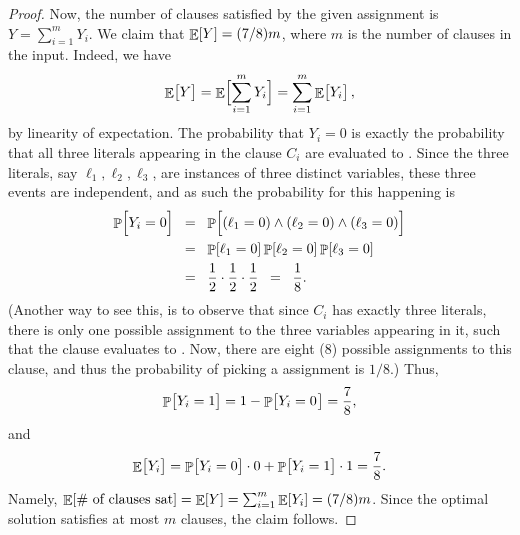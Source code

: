 \begin{proof}
    Now, the number of clauses satisfied by the given assignment is
    $Y=\sum_{i=1}^{m}Y_{i}$.  We claim that $\mathop{\mathbb{E}}\!\left[ {Y} \right] = (7/8)m$, where
    $m$ is the number of clauses in the input. Indeed, we have
    \begin{equation*}
        \Ex{Y\bigl.}%
        =%
        \Ex{\Bigl. \smash{\sum_{i=1}^{m}Y_{i}}}%
        =%
        \sum_{i=1}^{m}\Ex{Y_{i} \bigl.},
    \end{equation*}
    by linearity of expectation. The probability that $Y_{i} = 0$ is
    exactly the probability that all three literals appearing in the
    clause $C_i$ are evaluated to \FALSE. Since the three literals, say
    $\ell_1, \ell_2, \ell_3$, are instances of three distinct variables, these
    three events are independent, and as such the probability for this
    happening is
    \begin{align*}
        \Prob{\Bigl.Y_{i}
           =
           0 \bigl.}%
        &\EQ%
        \Prob{\Bigl. (\ell_1 = 0) \wedge (\ell_2 = 0) \wedge (\ell_3 = 0)} 
        \\&
        \EQ%
        \Prob{ \ell_1 = 0 }
        \Prob{\ell_2 = 0 }
        \Prob{\ell_3 = 0 }
        \\&
        \EQ%
        \frac{1}{2}\cdot\frac{1}{2}\cdot\frac{1}{2}
        \EQ
        \frac{1}{8}.
    \end{align*}
    (Another way to see this, is to observe that since $C_i$ has
    exactly three literals, there is only one possible assignment to
    the three variables appearing in it, such that the clause
    evaluates to \FALSE. Now, there are eight ($8$) possible assignments
    to this clause, and thus the probability of picking a \FALSE
    assignment is $1/8$.) Thus,
    \begin{equation*}
        \Prob{Y_{i}=1 \bigl.}%
        =%
        1-\Prob{ \bigl. Y_{i}=0 \ts }%
        =%
        \frac{7}{8},
    \end{equation*}
    and
    \begin{equation*}
        \Ex{Y_{i} \bigl.}%
        =%
        \Prob{Y_{i}=0 \bigl. } \cdot 0 + \Prob{Y_{i}=1 \bigl. } \cdot 1%
        =%
        \frac{7}{8}.
    \end{equation*}        
    Namely,
    $\mathop{\mathbb{E}}\!\left[ {\text{\# of clauses sat}} \right] = \mathop{\mathbb{E}}\!\left[ { Y } \right] =
    \sum_{i=1}^{m}\mathop{\mathbb{E}}\!\left[ {Y_{i}} \right] = (7/8) m$. Since the optimal solution
    satisfies at most $m$ clauses, the claim follows.
\end{proof}

\medskip

